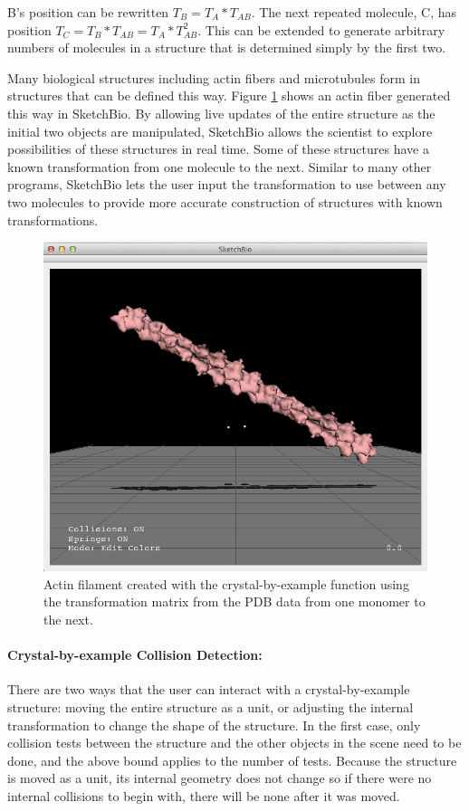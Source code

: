 \documentclass[twocolumn]{bmcart}%
\begin{document}
B's position can be rewritten $T_B = T_A*T_{AB}$.  The next repeated molecule, C, has position $T_C = T_B*T_{AB} = T_A*T_{AB}^2$.  This can be extended to generate arbitrary numbers of molecules in a structure that is determined simply by the first two.

Many biological structures including actin fibers and microtubules form in structures that can be defined this way.  Figure \ref{fig:crystal_actin} shows an actin fiber generated this way in SketchBio.  By allowing live updates of the entire structure as the initial two objects are manipulated, SketchBio allows the scientist to explore possibilities of these structures in real time.  Some of these structures have a known transformation from one molecule to the next.  Similar to many other programs, SketchBio lets the user input the transformation to use between any two molecules to provide more accurate construction of structures with known transformations.

\begin{figure}[h]
\centering
\includegraphics[width=0.9\columnwidth]{crystal_actin.png}
\caption{Actin filament created with the crystal-by-example function using the transformation matrix from the PDB data from one monomer to the next.}
\label{fig:crystal_actin}
\end{figure}

\paragraph*{Crystal-by-example Collision Detection:}
There are two ways that the user can interact with a crystal-by-example structure: moving the entire structure as a unit, or adjusting the internal transformation to change the shape of the structure.  In the first case, only collision tests between the structure and the other objects in the scene need to be done, and the above bound applies to the number of tests.  Because the structure is moved as a unit, its internal geometry does not change so if there were no internal collisions to begin with, there will be none after it was moved. 
\end{document}
